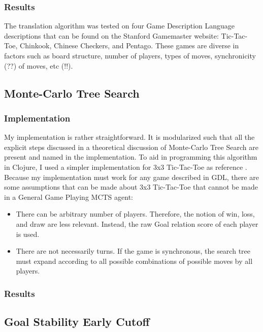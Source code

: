 \documentclass[letterpaper]{article}
\begin{document}

\subsubsection{Results}
The translation algorithm was tested on four Game Description Language descriptions that can be found on the Stanford Gamemaster website: Tic-Tac-Toe, Chinkook, Chinese Checkers, and Pentago. These games are diverse in factors such as board structure, number of players, types of moves, synchronicity (??) of moves, etc (!!).

\subsection{Monte-Carlo Tree Search}

\subsubsection{Implementation}
My implementation is rather straightforward. It is modularized such that all the explicit steps discussed in a theoretical discussion of Monte-Carlo Tree Search are present and named in the implementation. To aid in programming this algorithm in Clojure, I used a simpler implementation for 3x3 Tic-Tac-Toe as reference \cite{randomcomp}. Because my implementation must work for any game described in GDL, there are some assumptions that can be made about 3x3 Tic-Tac-Toe that cannot be made in a General Game Playing MCTS agent:
\begin{itemize}
\item There can be arbitrary number of players. Therefore, the notion of win, loss, and draw are less relevant. Instead, the raw Goal relation score of each player is used.
\item There are not necessarily turns. If the game is synchronous, the search tree must expand according to all possible combinations of possible moves by all players.
\end{itemize}

\subsubsection{Results}

\subsection{Goal Stability Early Cutoff}
\end{document}
